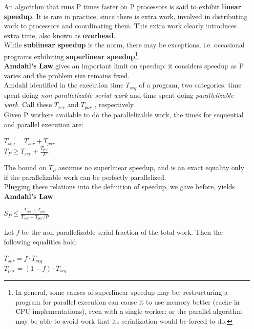 An algorithm that runs P times faster on P processors is said to exhibit \textbf{linear speedup}. It is rare in practice, since there is extra work, involved in distributing work to processors and coordinating them. This extra work clearly introduces extra time, also known as \textbf{overhead}.\\
While \textbf{sublinear speedup} is the norm\cite{structparprog}, there may be exceptions, i.e. occasional programs exhibiting \textbf{superlinear speedup}\footnote{In general, some causes of superlinear speedup may be: restructuring a program for parallel execution can cause it to use memory better (cache in CPU implementations), even with a single worker; or the parallel algorithm  may be able to avoid work that its serialization would be forced to do.}.\\%


\textbf{Amdahl's Law} gives an important limit on speedup: it considers speedup as P varies and the problem size remains fixed.\\
Amdahl identified in the execution time \(T_{seq}\) of a program, two categories: time spent doing \textit{non-parallelizable serial work} and time spent doing \textit{parallelizable work}. Call these \(T_{ser}\) and \(T_{par}\) , respectively. \\
Given P workers available to do the parallelizable work, the times for sequential and parallel execution are:
\begin{center}
	\(T_{seq} = T_{ser} + T_{par}\) \\
	\(T_{P} \geq T_{ser} + \frac{T_{par}}{P}\)
\end{center}

The bound on \(T_{P}\) assumes no superlinear speedup, and is an exact equality only if the parallelizable work can be perfectly parallelized.\\
Plugging these relations into the definition of speedup, we gave before, yields \textbf{Amdahl’s Law}:
\begin{center}
	\(S_{P} \leq \frac{T_{ser}+T_{par}}{T_{ser}+T_{par}/P}\)
\end{center}
Let \(f\) be the non-parallelizable serial fraction of the total work. Then the following equalities hold:
\begin{center}
	\(T_{ser} = f \cdot T_{seq}\)\\
	 \(T_{par} = (1-f) \cdot T_{seq}\)
\end{center}

